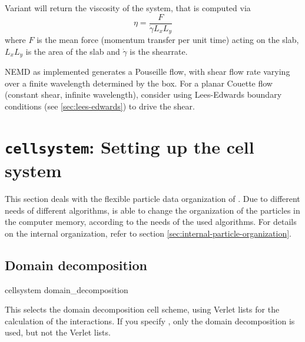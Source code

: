 Variant  will return the viscosity of the system, that is
computed via
\begin{equation}
  \eta = \frac{F}{\dot{\gamma} L_x L_y}
\end{equation}
where $F$ is the mean force (momentum transfer per unit time) acting
on the slab, $L_x L_y$ is the area of the slab and $\dot{\gamma}$ is the shearrate. 

NEMD as implemented generates a Pouseille flow, with shear flow rate varying over a finite wavelength determined by the box. For a planar Couette flow (constant shear, infinite wavelength), consider using Lees-Edwards boundary conditions (see \vref{sec:lees-edwards}) to drive the shear.

\section{\texttt{cellsystem}: Setting up the cell system}
\label{sec:cell-systems}

This section deals with the flexible particle data organization of
\es.  Due to different needs of different algorithms, \es is able to
change the organization of the particles in the computer memory,
according to the needs of the used algorithms. For details on the
internal organization, refer to section
\vref{sec:internal-particle-organization}.

\begin{pysyntax}
\end{pysyntax}


\subsection{Domain decomposition}

\begin{pysyntax}
\end{pysyntax}


\begin{essyntax}
  cellsystem domain_decomposition 
\end{essyntax}
This selects the domain decomposition cell scheme, using Verlet lists
for the calculation of the interactions. If you specify
, only the domain decomposition is used, but
not the Verlet lists.


